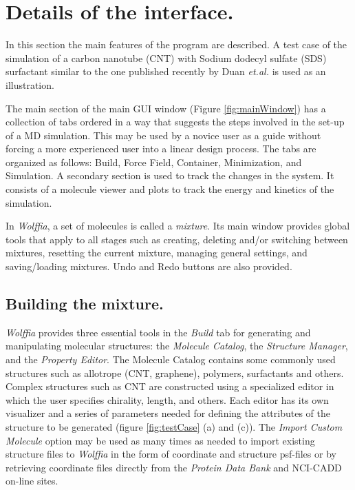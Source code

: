 \documentclass{article}
\begin{document}
\section{Details of the interface.}

In this section the main features of the program are described.  A test case of the simulation of a carbon nanotube (CNT) with Sodium dodecyl sulfate (SDS) surfactant similar to the one published recently by Duan \textit{et.al.} \cite{Collins2011} is used as an illustration.

The main section of the main GUI window (Figure \ref{fig:mainWindow}) has a collection of tabs ordered in a way that suggests the steps involved in the set-up of a MD simulation.  This may be used by a novice user as a guide without forcing a more experienced user into a linear design process.   The tabs are organized as follows: Build, Force Field, Container, Minimization, and Simulation.  A secondary section is used to track the changes in the system.  It consists of a molecule viewer and plots to track the energy and kinetics of the simulation.

In \textit{Wolffia}, a set of molecules is called a \textit{mixture}.  Its main window provides global tools that apply to all stages such as creating, deleting and/or switching between mixtures, resetting the current mixture, managing general settings, and saving/loading mixtures.  Undo and Redo buttons are also provided.



\subsection{Building the mixture.}
\textit{Wolffia} provides three essential tools in the \textit{Build} tab for generating and manipulating molecular structures: the \textit{Molecule Catalog}, the \textit{Structure Manager}, and the \textit{Property Editor}. The Molecule Catalog contains some commonly used structures such as allotrope (CNT, graphene), polymers, surfactants and others.  Complex structures such as CNT are constructed using a specialized editor in which the user specifies chirality, length, and others. Each editor has its own visualizer and a series of parameters needed for defining the attributes of the structure to be generated (figure \ref{fig:testCase} (a) and (c)). The \textit{Import Custom Molecule} option may be used as many times as needed to import existing structure files to \textit{Wolffia} in the form of coordinate and structure psf-files or by retrieving coordinate files directly from the \textit{Protein Data Bank} and NCI-CADD on-line sites.  
\end{document}
